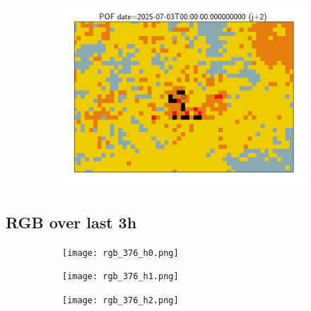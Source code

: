 \documentclass{article}
\begin{document}
\begin{figure}[H]
\begin{subfigure}[b]{0.31\textwidth}
    \end{subfigure}
    \begin{subfigure}[b]{0.36\textwidth}
        \centering
        \includegraphics[width=0.85\linewidth]{pof_376_j2.png} %
    \end{subfigure}
\end{figure}


\vspace{-1em}
\subsection*{RGB over last 3h}
\vspace{-1em}
\begin{figure}[H]
    \centering
    \begin{subfigure}[b]{0.32\textwidth}
        \centering
        \texttt{[image: rgb\_376\_h0.png]} %
    \end{subfigure}
    \begin{subfigure}[b]{0.32\textwidth}
        \centering
        \texttt{[image: rgb\_376\_h1.png]} %
    \end{subfigure}
    \begin{subfigure}[b]{0.32\textwidth}
        \centering
        \texttt{[image: rgb\_376\_h2.png]} %
    \end{subfigure}
\end{figure}
\end{document}
